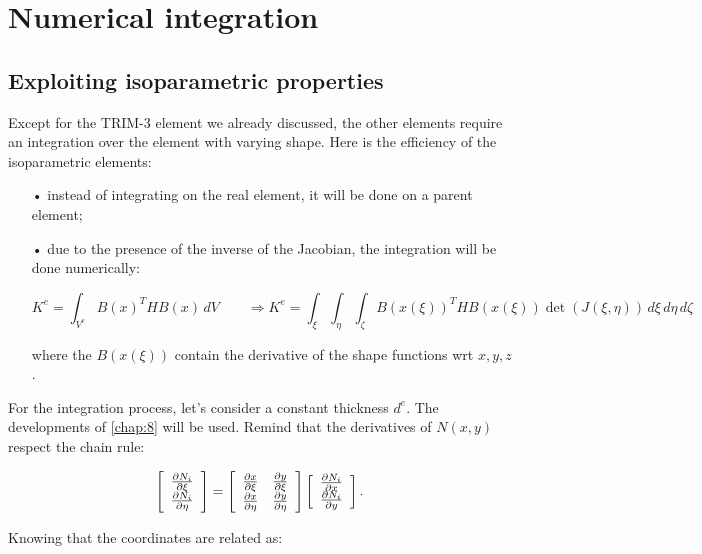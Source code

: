 
\chapter{Numerical integration}
\section{Exploiting isoparametric properties}
	Except for the TRIM-3 element we already discussed, the other elements require an integration over the element with varying shape. Here is the efficiency of the isoparametric elements: 
	
	\begin{itemize}
	\item[•] instead of integrating on the real element, it will be done on a parent element;
	\item[•] due to the presence of the inverse of the Jacobian, the integration will be done numerically: 
	
	\begin{equation}
	K^e = \int _{V^e} B(x) ^T H B(x) \, dV \qquad \Rightarrow 	K^e = \int _{\xi} \int _\eta \int _\zeta B(x(\xi)) ^T H B(x(\xi)) \det (J(\xi,\eta))\, d\xi \, d\eta \, d\zeta 
	\end{equation}
	
	where the $B(x(\xi))$ contain the derivative of the shape functions wrt $x,y,z$.
	\end{itemize}	 
	
	For the integration process, let's consider a constant thickness $d^e$. The developments of \autoref{chap:8} will be used. Remind that the derivatives of $N(x,y)$ respect the chain rule: 
	
	\begin{equation}
	\left[
	\begin{array}{c}
	\frac{\partial N_i}{\partial \xi}\\
	\frac{\partial N_i}{\partial \eta}
	\end{array}
	\right]
	=
	\left[
	\begin{array}{cc}
	\frac{\partial x}{\partial \xi} & \frac{\partial y}{\partial \xi}\\
	\frac{\partial x}{\partial \eta} & \frac{\partial y}{\partial \eta}
	\end{array}
	\right]
	\left[
	\begin{array}{c}
	\frac{\partial N_i}{\partial x}\\
	\frac{\partial N_i}{\partial y}
	\end{array}
	\right].
	\end{equation}
	
	Knowing that the coordinates are related as:
	
